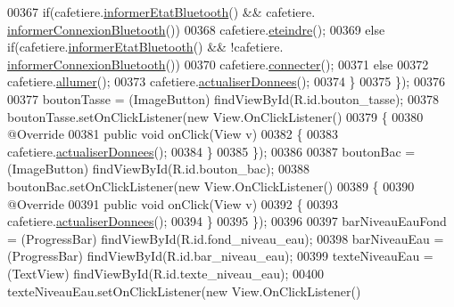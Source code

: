 \begin{DoxyCode}
00367                 \textcolor{keywordflow}{if}(cafetiere.\hyperlink{classcom_1_1example_1_1ekawa_1_1_cafetiere_aeff88ad385713a7897074dcdb76077a5}{informerEtatBluetooth}() && cafetiere.
      \hyperlink{classcom_1_1example_1_1ekawa_1_1_cafetiere_a97d9ca4701a961fe8865ecfa1d5bf64a}{informerConnexionBluetooth}())
00368                     cafetiere.\hyperlink{classcom_1_1example_1_1ekawa_1_1_cafetiere_acca6b757d8fad0d0faf64f3266557ca2}{eteindre}();
00369                 \textcolor{keywordflow}{else} \textcolor{keywordflow}{if}(cafetiere.\hyperlink{classcom_1_1example_1_1ekawa_1_1_cafetiere_aeff88ad385713a7897074dcdb76077a5}{informerEtatBluetooth}() && !cafetiere.
      \hyperlink{classcom_1_1example_1_1ekawa_1_1_cafetiere_a97d9ca4701a961fe8865ecfa1d5bf64a}{informerConnexionBluetooth}())
00370                     cafetiere.\hyperlink{classcom_1_1example_1_1ekawa_1_1_cafetiere_a7ea38fe01cdeb8588fc34de028907a9c}{connecter}();
00371                 \textcolor{keywordflow}{else}
00372                     cafetiere.\hyperlink{classcom_1_1example_1_1ekawa_1_1_cafetiere_afa405dc114a82fe74c06ff0971fa6cfc}{allumer}();
00373                 cafetiere.\hyperlink{classcom_1_1example_1_1ekawa_1_1_cafetiere_a1c6b2ea0e069cda876260e18ea8f6e84}{actualiserDonnees}();
00374             \}
00375         \});
00376 
00377         boutonTasse = (ImageButton) findViewById(R.id.bouton\_tasse);
00378         boutonTasse.setOnClickListener(\textcolor{keyword}{new} View.OnClickListener()
00379         \{
00380             @Override
00381             \textcolor{keyword}{public} \textcolor{keywordtype}{void} onClick(View v)
00382             \{
00383                 cafetiere.\hyperlink{classcom_1_1example_1_1ekawa_1_1_cafetiere_a1c6b2ea0e069cda876260e18ea8f6e84}{actualiserDonnees}();
00384             \}
00385         \});
00386 
00387         boutonBac = (ImageButton) findViewById(R.id.bouton\_bac);
00388         boutonBac.setOnClickListener(\textcolor{keyword}{new} View.OnClickListener()
00389         \{
00390             @Override
00391             \textcolor{keyword}{public} \textcolor{keywordtype}{void} onClick(View v)
00392             \{
00393                 cafetiere.\hyperlink{classcom_1_1example_1_1ekawa_1_1_cafetiere_a1c6b2ea0e069cda876260e18ea8f6e84}{actualiserDonnees}();
00394             \}
00395         \});
00396 
00397         barNiveauEauFond = (ProgressBar) findViewById(R.id.fond\_niveau\_eau);
00398         barNiveauEau = (ProgressBar) findViewById(R.id.bar\_niveau\_eau);
00399         texteNiveauEau = (TextView) findViewById(R.id.texte\_niveau\_eau);
00400         texteNiveauEau.setOnClickListener(\textcolor{keyword}{new} View.OnClickListener()

\end{DoxyCode}
